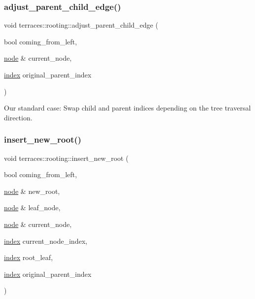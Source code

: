 \subsubsection{\texorpdfstring{adjust\+\_\+parent\+\_\+child\+\_\+edge()}{adjust\_parent\_child\_edge()}}
{\footnotesize\ttfamily void terraces\+::rooting\+::adjust\+\_\+parent\+\_\+child\+\_\+edge (\begin{DoxyParamCaption}\item[{bool}]{coming\+\_\+from\+\_\+left,  }\item[{\hyperlink{structterraces_1_1node}{node} \&}]{current\+\_\+node,  }\item[{\hyperlink{namespaceterraces_adbc33ccb543d1634e96d0eb02e472c77}{index}}]{original\+\_\+parent\+\_\+index }\end{DoxyParamCaption})}

Our standard case\+: Swap child and parent indices depending on the tree traversal direction. \mbox{\label{namespaceterraces_1_1rooting_a5fa10e038e438e5d9eb672bdaec413ea}} 
\subsubsection{\texorpdfstring{insert\+\_\+new\+\_\+root()}{insert\_new\_root()}}
{\footnotesize\ttfamily void terraces\+::rooting\+::insert\+\_\+new\+\_\+root (\begin{DoxyParamCaption}\item[{bool}]{coming\+\_\+from\+\_\+left,  }\item[{\hyperlink{structterraces_1_1node}{node} \&}]{new\+\_\+root,  }\item[{\hyperlink{structterraces_1_1node}{node} \&}]{leaf\+\_\+node,  }\item[{\hyperlink{structterraces_1_1node}{node} \&}]{current\+\_\+node,  }\item[{\hyperlink{namespaceterraces_adbc33ccb543d1634e96d0eb02e472c77}{index}}]{current\+\_\+node\+\_\+index,  }\item[{\hyperlink{namespaceterraces_adbc33ccb543d1634e96d0eb02e472c77}{index}}]{root\+\_\+leaf,  }\item[{\hyperlink{namespaceterraces_adbc33ccb543d1634e96d0eb02e472c77}{index}}]{original\+\_\+parent\+\_\+index }\end{DoxyParamCaption})}


